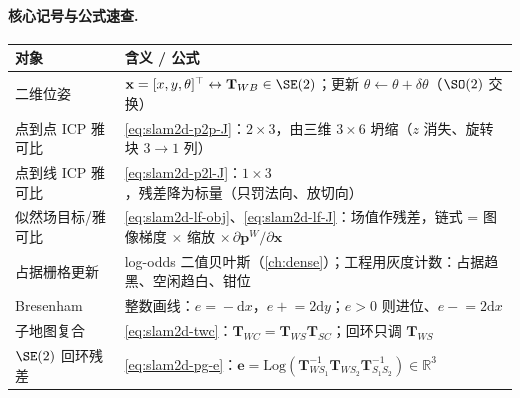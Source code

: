 \paragraph{核心记号与公式速查.}
\begin{table}[H]\centering\small
\begin{tabular}{p{} p{}}
\toprule
对象 & 含义 / 公式 \\
\midrule
二维位姿 & $\mathbf{x}=[x,y,\theta]^\top\leftrightarrow\mathbf{T}_{WB}\in\SE(2)$；更新 $\theta\!\leftarrow\!\theta+\delta\theta$（$\SO(2)$ 交换） \\
点到点 ICP 雅可比 & \cref{eq:slam2d-p2p-J}：$2\times 3$，由三维 $3\times 6$ 坍缩（$z$ 消失、旋转块 $3\!\to\!1$ 列） \\
点到线 ICP 雅可比 & \cref{eq:slam2d-p2l-J}：$1\times 3$，残差降为标量（只罚法向、放切向） \\
似然场目标/雅可比 & \cref{eq:slam2d-lf-obj}、\cref{eq:slam2d-lf-J}：场值作残差，链式 = 图像梯度 $\times$ 缩放 $\times\,\partial\mathbf{p}^W/\partial\mathbf{x}$ \\
占据栅格更新 & log-odds 二值贝叶斯（\cref{ch:dense}）；工程用灰度计数：占据趋黑、空闲趋白、钳位 \\
Bresenham & 整数画线：$e\!=\!-\mathrm{d}x$，$e\!+\!=\!2\mathrm{d}y$；$e\!>\!0$ 则进位、$e\!-\!=\!2\mathrm{d}x$ \\
子地图复合 & \cref{eq:slam2d-twc}：$\mathbf{T}_{WC}=\mathbf{T}_{WS}\mathbf{T}_{SC}$；回环只调 $\mathbf{T}_{WS}$ \\
$\SE(2)$ 回环残差 & \cref{eq:slam2d-pg-e}：$\mathbf{e}=\mathrm{Log}(\mathbf{T}_{WS_1}^{-1}\mathbf{T}_{WS_2}\mathbf{T}_{S_1S_2}^{-1})\in\mathbb{R}^3$ \\
\bottomrule
\end{tabular}
\end{table}


